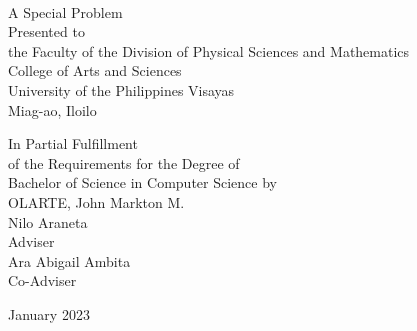 \begin{titlepage}
\centering

 \\

\vspace{1.5cm}
A Special Problem\\
Presented to\\
the Faculty of the Division of Physical Sciences and Mathematics\\
College of Arts and Sciences\\
University of the Philippines Visayas\\
Miag-ao, Iloilo

\vspace{1.5cm}
In Partial Fulfillment\\
of the Requirements for the Degree of\\
Bachelor of Science in Computer Science
\vspace{1.5cm}
by\\

\vspace{0.5cm}
OLARTE, John Markton M.  \\

\vspace{1.5cm}
Nilo Araneta \\
Adviser\\
Ara Abigail Ambita\\
Co-Adviser

\vspace{1.5cm}
January 2023
\end{titlepage}
    